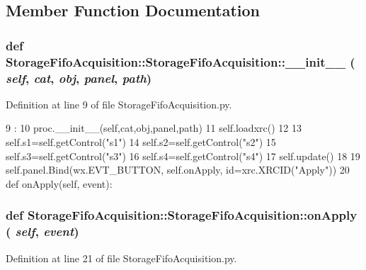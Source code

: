 \subsection{Member Function Documentation}
\hypertarget{classStorageFifoAcquisition_1_1StorageFifoAcquisition_a2ff9fedd875f1052c463d863abd6b63a}{
\subsubsection[{\_\-\_\-init\_\-\_\-}]{\setlength{\rightskip}{0pt plus 5cm}def StorageFifoAcquisition::StorageFifoAcquisition::\_\-\_\-init\_\-\_\- ( {\em self}, \/   {\em cat}, \/   {\em obj}, \/   {\em panel}, \/   {\em path})}}
\label{classStorageFifoAcquisition_1_1StorageFifoAcquisition_a2ff9fedd875f1052c463d863abd6b63a}


Definition at line 9 of file StorageFifoAcquisition.py.


\begin{DoxyCode}
9                                              :
10         proc.__init__(self,cat,obj,panel,path)
11         self.loadxrc()
12 
13         self.s1=self.getControl("s1")
14         self.s2=self.getControl("s2")
15         self.s3=self.getControl("s3")
16         self.s4=self.getControl("s4")
17         self.update()
18 
19         self.panel.Bind(wx.EVT_BUTTON, self.onApply, id=xrc.XRCID("Apply"))
20 
    def onApply(self, event):
\end{DoxyCode}
\hypertarget{classStorageFifoAcquisition_1_1StorageFifoAcquisition_a18b2663375af7ca99203e3e0b404b045}{
\subsubsection[{onApply}]{\setlength{\rightskip}{0pt plus 5cm}def StorageFifoAcquisition::StorageFifoAcquisition::onApply ( {\em self}, \/   {\em event})}}
\label{classStorageFifoAcquisition_1_1StorageFifoAcquisition_a18b2663375af7ca99203e3e0b404b045}


Definition at line 21 of file StorageFifoAcquisition.py.


